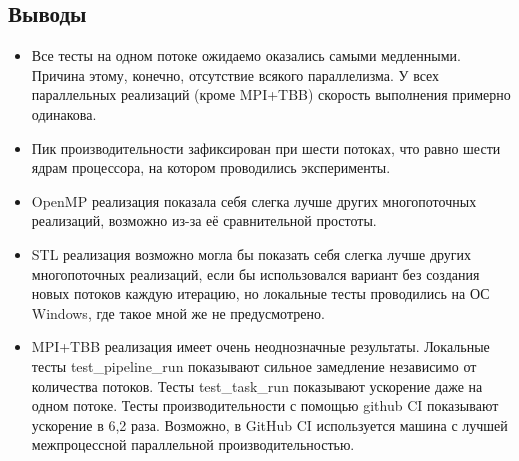 \documentclass[12pt,a4paper]{extarticle}
\begin{document}
\subsection{Выводы}
\begin{itemize}
\item Все тесты на одном потоке ожидаемо оказались самыми медленными. Причина этому, конечно, отсутствие всякого параллелизма.
У всех параллельных реализаций (кроме MPI+TBB) скорость выполнения примерно одинакова.
\item Пик производительности зафиксирован при шести потоках, что равно шести ядрам процессора, на котором проводились эксперименты.
\item OpenMP реализация показала себя слегка лучше других многопоточных реализаций, возможно из-за её сравнительной простоты.
\item STL реализация возможно могла бы показать себя слегка лучше других многопоточных реализаций, если бы использовался вариант без создания новых потоков каждую итерацию, но локальные тесты проводились на ОС Windows, где такое мной же не предусмотрено.
\item MPI+TBB реализация имеет очень неоднозначные результаты. Локальные тесты test\_pipeline\_run показывают сильное замедление независимо от количества потоков. Тесты test\_task\_run показывают ускорение даже на одном потоке. Тесты производительности с помощью github CI показывают ускорение в 6,2 раза. Возможно, в GitHub CI используется машина с лучшей межпроцессной параллельной производительностью.
\end{itemize}

\newpage
\end{document}

